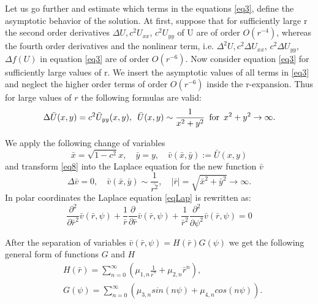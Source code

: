 \documentclass[12pt]{article}
\theoremstyle{theorem}
\theoremstyle{defi}
\begin{document}
Let us go further and estimate which terms in the equations \eqref{eq3},  define the asymptotic behavior of the solution. At first, suppose that for sufficiently large r the second order derivatives $\Delta U , c^2U_{xx}$, $c^2U_{yy}$  of U are of order  $O(r^{-4})$, whereas the fourth order derivatives and the nonlinear term, i.e.  $\Delta^2 U , c^2\Delta U_{xx}$, $c^2\Delta U_{yy}$, $\Delta f(U)$    in equation \eqref{eq3} are of order $O(r^{-6})$.
Now consider equation \eqref{eq3} for sufficiently large values of r. We insert the asymptotic values of all terms in \eqref{eq3} and neglect the higher order terms of order $O(r^{-6})$ inside the r-expansion. Thus for large values of $r$ the following formulas are valid:
\begin{equation}
 \Delta \bar{U}(x,y) =   c^2   \bar{U}_{yy}(x,y) , \enskip  \bar{U}(x,y) \sim \frac{1}{x^2 + y^2} \enskip \text{for} \enskip x^2 + y^2 \rightarrow \infty . \label{eq8}
\end{equation}


We apply the following change of variables
$$
\bar{x} = \sqrt{1-c^2}x , \quad  \bar{y} = y, \quad \bar{v}( \bar{x}, \bar{y}) := \bar{U} (x, y)
$$
and transform \eqref{eq8} into the Laplace equation for the new function $\bar{v}$
\begin{equation} \label{eqLap}
\Delta \bar{v} = 0, \quad \bar{v}( \bar{x}, \bar{y}) \sim \frac{1}{\bar{r^2}}, \quad |\bar{r}|=\sqrt{\bar{x}^2 + \bar{y}^2} \rightarrow \infty.
\end{equation}
In polar coordinates the Laplace equation \eqref{eqLap} is rewritten as:
\begin{equation} \label{eqLapPol}
\frac{\partial^2}{\partial \bar{r}^2} \bar{v}(\bar{r}, \psi) + \frac{1}{\bar{r}} \frac{\partial}{\partial \bar{r}}\bar{v}(\bar{r}, \psi) +  \frac{1}{\bar{r}^2} \frac{\partial^2}{\partial \psi^2} \bar{v}(\bar{r}, \psi) = 0
\end{equation}

After the separation of variables $\bar{v}(\bar{r}, \psi) = H(\bar{r})G(\psi)$  we get the following general form of functions $G$ and $H$
\begin{align}
&H(\bar{r}) = \sum^{\infty}_{n=0} (\mu_{1,n} \frac{1}{ \bar{r}^n} + \mu_{2,n} \bar{r}^n ),
\\ \nonumber &G(\psi) = \sum^{\infty}_{n=0} (\mu_{3,n}sin(n \psi ) + \mu_{4,n}cos(n \psi)). \label{eq9}
\end{align}
\end{document}
